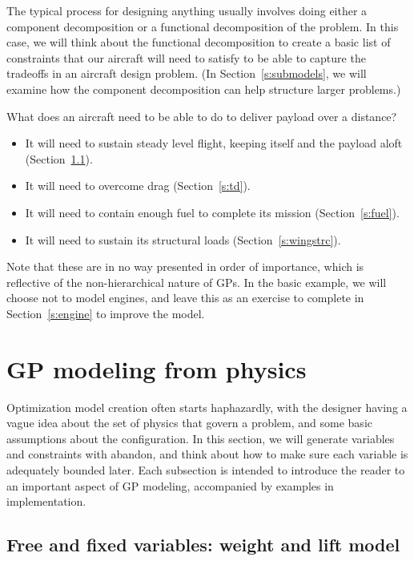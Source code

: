 The typical process for designing anything usually involves doing either a
component decomposition or a functional decomposition of the problem. In
this case, we will think about the functional decomposition to create a
basic list of constraints that our aircraft will need to satisfy to be
able to capture the tradeoffs in an aircraft design problem. (In
Section~\ref{s:submodels}, we will examine how
the component decomposition
can help structure larger problems.)

What does an aircraft need to be able to do to deliver payload over a distance?
\begin{itemize}
	\item It will need to sustain steady
    level flight, keeping itself and the payload aloft (Section~\ref{s:wl}).
    \item It will need to overcome drag (Section~\ref{s:td}).
	\item It will need to contain enough fuel to complete its mission
        (Section~\ref{s:fuel}).
	\item It will need to sustain its structural loads (Section~\ref{s:wingstrc}).
\end{itemize}

Note that these are in no way presented in order of importance, which is reflective
of the non-hierarchical nature of \gls{GP}s.
In the basic example, we will choose not to model engines,
and leave this as an exercise
to complete in Section~\ref{s:engine} to improve the model.

\section{GP modeling from physics}

Optimization model creation often starts haphazardly, with the designer having a
vague idea about the set of physics that govern a problem, and some basic
assumptions about the configuration. In this section, we will
generate variables and constraints with abandon, and think about how to make
sure each variable is adequately bounded later. Each subsection is intended
to introduce the reader to an important aspect of \gls{GP} modeling,
accompanied by examples in implementation.

\subsection{Free and fixed variables: weight and lift model}
\label{s:wl}

